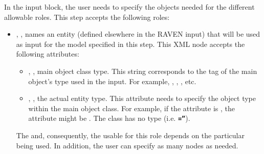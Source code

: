 In the  input block, the user needs to specify the objects
needed for the different allowable roles.
%
This step accepts the following roles:
\begin{itemize}
\item {}, , names an entity
(defined elsewhere in the RAVEN input) that will be used as input for the model
specified in this step.
This XML node accepts the following attributes:
\begin{itemize}
  \item {}, , main object class
    type.
    This string corresponds to the tag of the main object's type used in the 
    input.
    For example, , , ,
    etc.
  \item {}, , the actual entity
    type.
    This attribute needs to specify the object type within the main object
    class.
    For example, if the   attribute is , the
     attribute might be .
    \nb The class  has no type (i.e. 
    \textbf{\texttt{=''}}).
\end{itemize}

\nb The  and, consequently, the  usable for this
role depends on the particular  being used.
%
In addition, the user can specify as many  nodes as needed.


\end{itemize}
